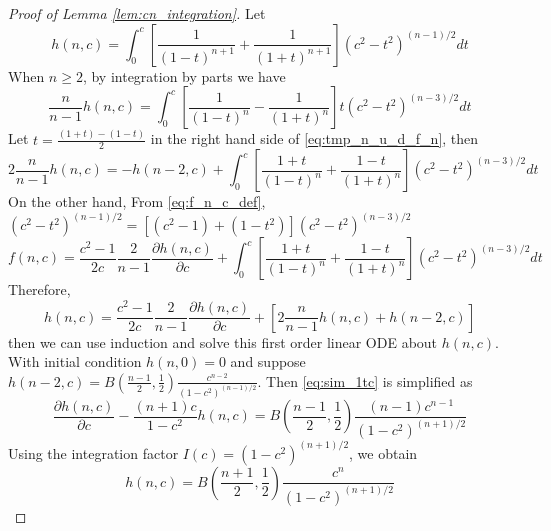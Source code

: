 \documentclass{aptpub}
\begin{document}
\begin{proof}[Proof of Lemma \ref{lem:cn_integration}]
     Let
\begin{equation}\label{eq:f_n_c_def}
h(n,c)=   \int_0^{c}
    [\frac{1}{(1-t)^{n+1}}+\frac{1}{(1+t)^{n+1}}]
    (c^2- t^2)^{(n-1)/2}dt
\end{equation}
When $n\geq 2$, by integration by parts 
we have 
\begin{equation}\label{eq:tmp_n_u_d_f_n}
    \frac{n}{n-1}h(n,c)
    =\int_0^{c}
    \left[\frac{1}{(1-t)^{n}}
    -\frac{1}{(1+t)^{n}}
    \right]
    t(c^2- t^2)^{(n-3)/2}
    dt
\end{equation}
Let $t=\frac{(1+t)-(1-t)}{2}$ in the right hand side
of \eqref{eq:tmp_n_u_d_f_n}, then
\begin{equation}
    2\frac{n}{n-1}h(n,c)
=    -h(n-2,c)  
+ \int_0^{c}
\left[\frac{1+t}{(1-t)^{n}}
+\frac{1-t}{(1+t)^{n}}
\right]
(c^2- t^2)^{(n-3)/2}
dt
\end{equation}
On the other hand,
From \eqref{eq:f_n_c_def},
$(c^2-t^2)^{(n-1)/2}
=[(c^2-1)+(1-t^2)](c^2-t^2)^{(n-3)/2}$
\begin{equation}
    f(n, c) = \frac{c^2-1}{2c}\frac{2}{n-1}\frac{\partial h(n,c)}{\partial c}
    +  \int_0^{c}
    \left[\frac{1+t}{(1-t)^{n}}
    +\frac{1-t}{(1+t)^{n}}
    \right]
    (c^2- t^2)^{(n-3)/2}
    dt
\end{equation}
Therefore,
\begin{equation}\label{eq:sim_1tc}
    h(n,c)=\frac{c^2-1}{2c}\frac{2}{n-1}\frac{\partial h(n,c)}{\partial c}
    + [2\frac{n}{n-1} h(n,c) + h(n-2, c)]
\end{equation}
then we can use induction and solve this
first order linear ODE about $h(n,c)$.
With initial condition $h(n,0)=0$ and
suppose
$h(n-2,c)=B(\frac{n-1}{2}, \frac{1}{2})
\frac{c^{n-2}}{(1-c^2)^{(n-1)/2}}$.
Then \eqref{eq:sim_1tc} is simplified as
\begin{equation}
    \frac{\partial h(n,c)}{\partial c}
    - \frac{(n+1)c}{1-c^2} h(n,c)
    = B(\frac{n-1}{2}, \frac{1}{2})\frac{(n-1)c^{n-1}}{(1-c^2)^{(n+1)/2}}
\end{equation}
Using the integration factor $I(c)=(1-c^2)^{(n+1)/2}$, we obtain
\begin{equation}\label{eq:f_n_c_expression}
    h(n,c)= B(\frac{n+1}{2}, \frac{1}{2})
    \frac{c^n}{(1-c^2)^{(n+1)/2}}
\end{equation}

\end{proof}
\end{document}
